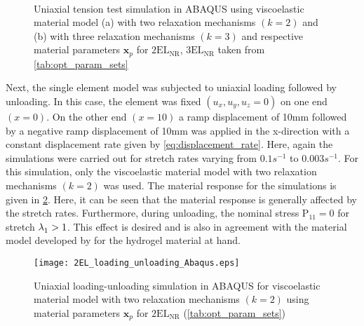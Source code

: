 \begin{figure}[htpb]
    \centering
     \label{fig:abaqus_comparison_2EL}
     \label{fig:abaqus_comparison_3EL}\\
    \caption[Uniaxial tension test simulation]{Uniaxial tension test simulation in ABAQUS using viscoelastic material model (a) with two relaxation mechanisms \((k=2)\) and (b) with three relaxation mechanisms \((k=3)\) and respective material parameters \(\bm{x}_{p}\) for \(2\mathrm{EL}_{\mathrm{NR}}\), \(3\mathrm{EL}_{\mathrm{NR}}\) taken from \cref{tab:opt_param_sets}}
    \label{fig:abaqus_comparison}
\end{figure}

Next, the single element model was subjected to uniaxial loading followed by unloading. In this case, the element was fixed \((u_{x}, u_{y}, u_{z} = 0)\) on one end \((x=0)\).  On the other end \((x=10)\) a ramp displacement of 10mm followed by a negative ramp displacement of 10mm was applied in the x-direction with a constant displacement rate  given by \cref{eq:displacement_rate}. Here, again the simulations were carried out for stretch rates varying from \(0.1s^{-1}\) to \(0.003s^{-1}\). For this simulation, only the viscoelastic material model with two relaxation mechanisms \((k=2)\) was used. The material response for the simulations is given in \cref{fig:loading_unloading_abaqus}. Here, it can be seen that the material response is generally affected by the stretch rates. Furthermore, during unloading, the nominal stress \(\mathrm{P}_{11} = 0\) for stretch \(\lambda^{}_{{1}} > 1\). This effect is desired and is also in agreement with the  material model developed by \citeauthor{Long2014Oct} \cite{Long2014Oct} for the hydrogel material at hand.

\begin{figure}[htbp]
    \centering
    \texttt{[image: 2EL\_loading\_unloading\_Abaqus.eps]}
    \caption[Uniaxial loading and unloading simulation]{Uniaxial loading-unloading simulation in ABAQUS for viscoelastic material model with two relaxation mechanisms \((k=2)\) using material parameters \(\bm{x}_{p}\) for \(2\mathrm{EL}_{\mathrm{NR}}\) (\cref{tab:opt_param_sets}) }%
    \label{fig:loading_unloading_abaqus}
\end{figure}

